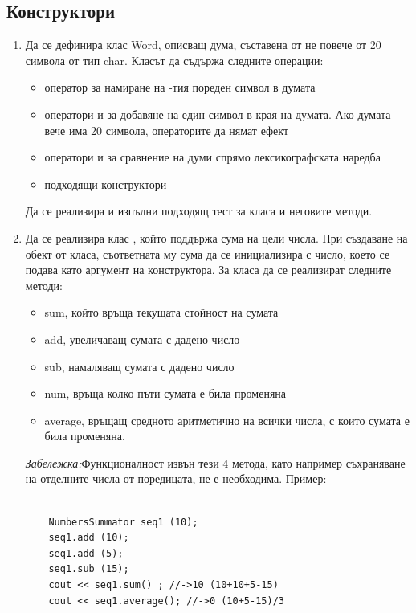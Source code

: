 \subsection {Конструктори}

\begin{enumerate}

\item Да се дефинира клас Word, описващ дума, съставена от не повече от 20 символа от тип char. Класът да съдържа следните операции:

\begin{itemize}
\item оператор \code{[]} за намиране на -тия пореден символ в думата
\item оператори \code{+} и \code{+=} за добавяне на един символ в края на думата. Ако думата вече има 20 символа, операторите да нямат ефект
\item оператори \code{<} и \code{==} за сравнение на думи спрямо лексикографската наредба
\item подходящи конструктори

\end{itemize}

Да се реализира и изпълни подходящ тест за класа и неговите методи.


\item Да се реализира клас ,  който поддържа сума на цели числа. При създаване на обект от класа,  съответната му сума да се инициализира с число, което се подава като аргумент на конструктора. За класа да се реализират следните методи:

\begin{itemize}
\item sum, който връща текущата стойност на сумата
\item add, увеличаващ сумата с дадено число
\item sub, намаляващ сумата с дадено число
\item num, връща колко пъти сумата е била променяна
\item average, връщащ средното аритметично на всички числа, с които сумата е била променяна.

\end{itemize}


\textit{Забележка:}Функционалност извън тези 4 метода, като например съхраняване на отделните числа от поредицата, не е необходима.
Пример:
\begin{lstlisting}

	NumbersSummator seq1 (10);
	seq1.add (10);
	seq1.add (5);
	seq1.sub (15);
	cout << seq1.sum() ; //->10 (10+10+5-15)
	cout << seq1.average(); //->0 (10+5-15)/3


\end{lstlisting}
\end{enumerate}
